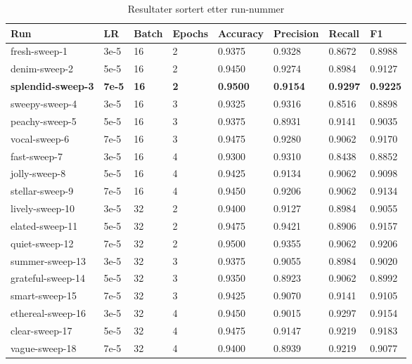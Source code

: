 \begin{table}
\caption{Resultater sortert etter run-nummer}
\label{tab:results}
\begin{tabular}{llllllll}
\toprule
Run & LR & Batch & Epochs & Accuracy & Precision & Recall & F1 \\
\midrule
fresh-sweep-1 & 3e-5 & 16 & 2 & 0.9375 & 0.9328 & 0.8672 & 0.8988 \\
denim-sweep-2 & 5e-5 & 16 & 2 & 0.9450 & 0.9274 & 0.8984 & 0.9127 \\
\textbf{splendid-sweep-3} & \textbf{7e-5} & \textbf{16} & \textbf{2} & \textbf{0.9500} & \textbf{0.9154} & \textbf{0.9297} & \textbf{0.9225} \\
sweepy-sweep-4 & 3e-5 & 16 & 3 & 0.9325 & 0.9316 & 0.8516 & 0.8898 \\
peachy-sweep-5 & 5e-5 & 16 & 3 & 0.9375 & 0.8931 & 0.9141 & 0.9035 \\
vocal-sweep-6 & 7e-5 & 16 & 3 & 0.9475 & 0.9280 & 0.9062 & 0.9170 \\
fast-sweep-7 & 3e-5 & 16 & 4 & 0.9300 & 0.9310 & 0.8438 & 0.8852 \\
jolly-sweep-8 & 5e-5 & 16 & 4 & 0.9425 & 0.9134 & 0.9062 & 0.9098 \\
stellar-sweep-9 & 7e-5 & 16 & 4 & 0.9450 & 0.9206 & 0.9062 & 0.9134 \\
lively-sweep-10 & 3e-5 & 32 & 2 & 0.9400 & 0.9127 & 0.8984 & 0.9055 \\
elated-sweep-11 & 5e-5 & 32 & 2 & 0.9475 & 0.9421 & 0.8906 & 0.9157 \\
quiet-sweep-12 & 7e-5 & 32 & 2 & 0.9500 & 0.9355 & 0.9062 & 0.9206 \\
summer-sweep-13 & 3e-5 & 32 & 3 & 0.9375 & 0.9055 & 0.8984 & 0.9020 \\
grateful-sweep-14 & 5e-5 & 32 & 3 & 0.9350 & 0.8923 & 0.9062 & 0.8992 \\
smart-sweep-15 & 7e-5 & 32 & 3 & 0.9425 & 0.9070 & 0.9141 & 0.9105 \\
ethereal-sweep-16 & 3e-5 & 32 & 4 & 0.9450 & 0.9015 & 0.9297 & 0.9154 \\
clear-sweep-17 & 5e-5 & 32 & 4 & 0.9475 & 0.9147 & 0.9219 & 0.9183 \\
vague-sweep-18 & 7e-5 & 32 & 4 & 0.9400 & 0.8939 & 0.9219 & 0.9077 \\
\bottomrule
\end{tabular}
\end{table}
